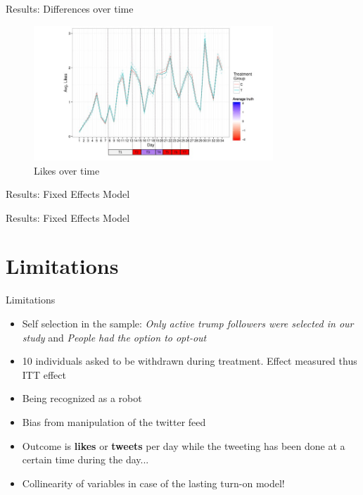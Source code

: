 \documentclass[10pt]{beamer}\usepackage[]{graphicx}\usepackage[]{color}
\begin{document}
\begin{frame}{Results: Differences over time}

\begin{figure}
\includegraphics[width=9cm]{../plots/likes_tweets.jpg}
\caption{Likes over time}
\end{figure}

\end{frame}



\begin{frame}{Results: Fixed Effects Model}

{\tiny

}


\end{frame}

\begin{frame}{Results: Fixed Effects Model}

{\tiny

}


\end{frame}


\section{Limitations}
\begin{frame}{Limitations}
\begin{itemize}

\item Self selection in the sample: 
\textit{Only active trump followers were selected in our study} and \textit{People had the option to opt-out}
	\item 10 individuals asked to be withdrawn during treatment. Effect measured thus ITT effect
\item Being recognized as a robot
\item Bias from manipulation of the twitter feed
\item Outcome is \textbf{likes} or \textbf{tweets} per day while the tweeting has been done at a certain time during the day...
\item Collinearity of variables in case of the lasting turn-on model!
\end{itemize}
\end{frame}
\end{document}
